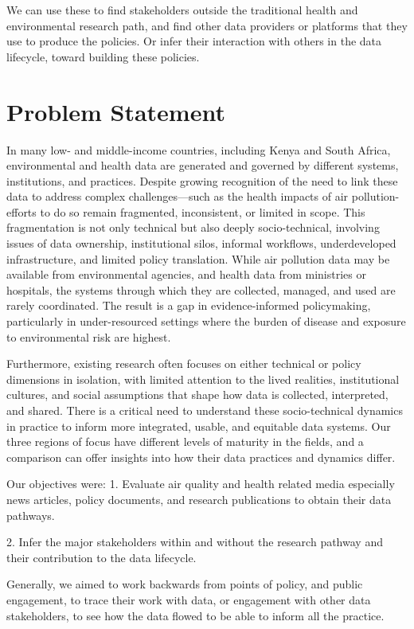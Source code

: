 \documentclass{article}
\begin{document}
We can use these to find stakeholders outside the traditional health and environmental research path, and find other data providers or platforms that they use to produce the policies. Or infer their interaction with others in the data lifecycle, toward building these policies.  

   

\section{Problem Statement}
In many low- and middle-income countries, including Kenya and South Africa, environmental and health data are generated and governed by different systems, institutions, and practices. Despite growing recognition of the need to link these data to address complex challenges—such as the health impacts of air pollution- efforts to do so remain fragmented, inconsistent, or limited in scope. This fragmentation is not only technical but also deeply socio-technical, involving issues of data ownership, institutional silos, informal workflows, underdeveloped infrastructure, and limited policy translation. While air pollution data may be available from environmental agencies, and health data from ministries or hospitals, the systems through which they are collected, managed, and used are rarely coordinated. The result is a gap in evidence-informed policymaking, particularly in under-resourced settings where the burden of disease and exposure to environmental risk are highest.

Furthermore, existing research often focuses on either technical or policy dimensions in isolation, with limited attention to the lived realities, institutional cultures, and social assumptions that shape how data is collected, interpreted, and shared. There is a critical need to understand these socio-technical dynamics in practice to inform more integrated, usable, and equitable data systems. Our three regions of focus have different levels of maturity in the fields, and a comparison can offer insights into how their data practices and dynamics differ. 


Our objectives were:
1. Evaluate air quality and health related media especially news articles, policy documents, and research publications to obtain their data pathways.


2. Infer the major stakeholders within and without the research pathway and their contribution to the data lifecycle.


Generally, we aimed to work backwards from points of policy, and public engagement, to trace their work with data, or engagement with other data stakeholders, to see how the data flowed to be able to inform all the practice.
\end{document}

